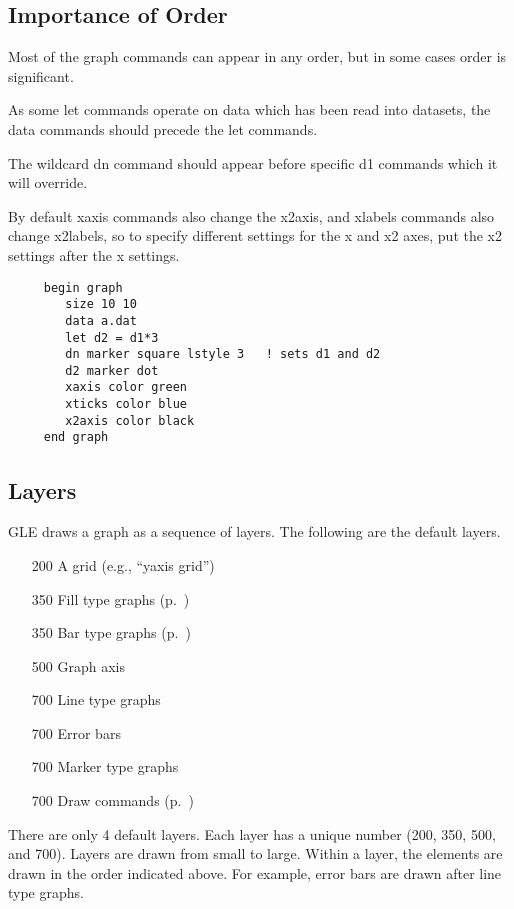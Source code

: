\subsection{Importance of Order}
Most of the graph commands can appear in any order, but in some
cases order is significant.

As some {\sf let} commands operate on data which has been read into datasets,
the {\sf data} commands should precede the {\sf let} commands.

The wildcard {\sf dn} command should appear before
specific {\sf d1} commands which it will override.

By default xaxis commands also change the x2axis, and xlabels commands
also change x2labels, so to specify different settings for
the x and x2 axes, put the x2 settings after the x settings.

\preglecode{}
\begin{Verbatim}
     begin graph
        size 10 10
        data a.dat
        let d2 = d1*3
        dn marker square lstyle 3   ! sets d1 and d2
        d2 marker dot
        xaxis color green
        xticks color blue
        x2axis color black
     end graph
\end{Verbatim}
\postglecode{}

\subsection{Layers}
\label{cmd:layer}

GLE draws a graph as a sequence of layers. The following are the default layers.

\begin{itemize}
\item[200] A grid (e.g., ``yaxis grid'')
\item[350] Fill type graphs (p.~\pageref{cmd:fill})
\item[350] Bar type graphs (p.~\pageref{cmd:bar})
\item[500] Graph axis
\item[700] Line type graphs
\item[700] Error bars
\item[700] Marker type graphs
\item[700] Draw commands (p.~\pageref{cmd:gdraw})
\end{itemize}

There are only 4 default layers. Each layer has a unique number (200, 350, 500, and 700). Layers are drawn from small to large. Within a layer, the elements are drawn in the order indicated above. For example, error bars are drawn after line type graphs.

